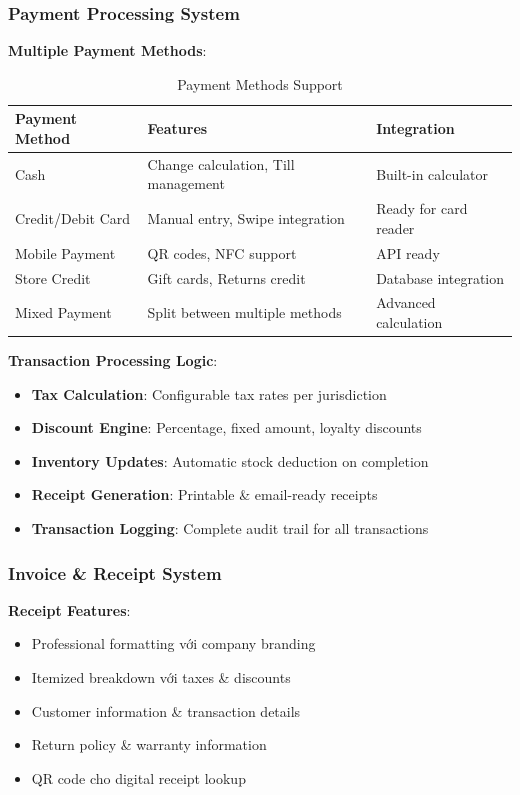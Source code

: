 \documentclass[12pt,a4paper]{article}
\begin{document}
\subsubsection{Payment Processing System}
\textbf{Multiple Payment Methods}:
\begin{table}[H]
\centering
\begin{tabular}{@{}lll@{}}
\toprule
\textbf{Payment Method} & \textbf{Features} & \textbf{Integration} \\
\midrule
Cash & Change calculation, Till management & Built-in calculator \\
Credit/Debit Card & Manual entry, Swipe integration & Ready for card reader \\
Mobile Payment & QR codes, NFC support & API ready \\
Store Credit & Gift cards, Returns credit & Database integration \\
Mixed Payment & Split between multiple methods & Advanced calculation \\
\bottomrule
\end{tabular}
\caption{Payment Methods Support}
\end{table}

\textbf{Transaction Processing Logic}:
\begin{itemize}
    \item \textbf{Tax Calculation}: Configurable tax rates per jurisdiction
    \item \textbf{Discount Engine}: Percentage, fixed amount, loyalty discounts
    \item \textbf{Inventory Updates}: Automatic stock deduction on completion
    \item \textbf{Receipt Generation}: Printable \& email-ready receipts
    \item \textbf{Transaction Logging}: Complete audit trail for all transactions
\end{itemize}

\subsubsection{Invoice \& Receipt System}
\textbf{Receipt Features}:
\begin{itemize}
    \item Professional formatting với company branding
    \item Itemized breakdown với taxes \& discounts
    \item Customer information \& transaction details
    \item Return policy \& warranty information
    \item QR code cho digital receipt lookup
\end{itemize}
\end{document}
